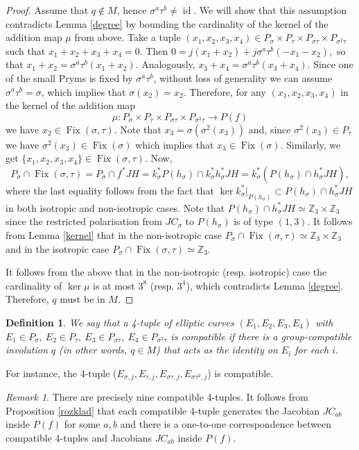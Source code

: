 \documentclass{amsart}
\newtheorem{defn}[thm]{Definition}
\theoremstyle{remark}
\newtheorem{rem}[thm]{Remark}
\numberwithin{equation}{section}
\newcommand{\s}{\sigma}
\DeclareMathOperator{\id}{id}
\DeclareMathOperator{\Fix}{Fix}
\begin{document}
\begin{proof}
      Assume that $q \notin M$, hence $\sigma^a\tau^b \neq \id$. We will show that this assumption contradicts Lemma \ref{degree} by bounding the cardinality of the kernel of the addition map $\mu$ from above. Take a tuple $(x_1, x_2, x_3, x_4) \in P_{\sigma} \times P_{\tau} \times P_{\sigma\tau}\times P_{\sigma^2\tau}$ such that $x_1 + x_2 + x_3 + x_4 = 0$. Then $0 = j(x_1 + x_2) + j\sigma^a\tau^b(-x_1 - x_2),$ so that $x_1 + x_2 = \sigma^a\tau^b(x_1 + x_2)$. Analogously, $x_3 + x_4 = \sigma^a\tau^b(x_3 + x_4)$.
    Since one of the small Pryms is fixed by $\sigma^a\tau^b$, without loss of generality   we can assume $\sigma^a\tau^b = \sigma$, which implies that $\sigma(x_2) = x_2$.
    Therefore, for any $(x_1, x_2, x_3, x_4)$ in the kernel of the addition map $$\mu: P_{\sigma} \times P_{\tau} \times P_{\sigma\tau}\times P_{\sigma^2\tau} \to P(f)$$ we have $x_2 \in \Fix(\sigma, \tau)$.  Note that $x_3 = \sigma(\sigma^2(x_3))$ and, since $\sigma^2(x_3) \in P_{\tau}$ we have $\sigma^2(x_3) \in \Fix(\s)$ which implies that $x_3 \in \Fix(\sigma)$. Similarly, we get $\{x_1, x_2, x_3, x_4\} \in \Fix(\sigma, \tau)$. Now, $$P_{\sigma} \cap \Fix(\sigma, \tau) = P_{\sigma} \cap f^*JH = k_{\sigma}^*P(h_{\sigma}) \cap k_{\s}^*h_{\s}^*JH = k_{\s}^*(P(h_\s) \cap h_{\s}^*JH),$$ where the last equality follows from the fact that $\ker k_{\sigma}^{*}|_{P(h_{\s})} \subset P(h_\s) \cap h_{\s}^*JH$ in both isotropic and non-isotropic cases. Note that $P(h_\s) \cap h_{\s}^*JH \simeq \mathbb{Z}_3 \times \mathbb{Z}_3$ since the restricted polarisation from $JC_{\sigma}$ to $P(h_{\sigma})$ is of type $(1,3)$. It follows from Lemma \ref{kernel} that in the non-isotropic case $P_{\sigma} \cap \Fix(\sigma, \tau) \simeq \mathbb{Z}_3 \times \mathbb{Z}_3$ and in the isotropic case $P_{\sigma} \cap \Fix(\sigma, \tau) \simeq \mathbb{Z}_3$. 
    
    It follows from the above that in the non-isotropic (resp. isotropic) case the cardinality of $\ker \mu$ is at most $3^8$ (resp. $3^4$), which contradicts Lemma \ref{degree}. Therefore, $q$ must be in $M$.
   

   
    
    \end{proof}

    \begin{defn}
        We say that a 4-tuple of elliptic curves $(E_1, E_2, E_3, E_4)$ with $E_1 \in P_{\sigma},\ E_2 \in P_{\tau},\ E_3 \in P_{\sigma\tau},\ E_4 \in P_{\sigma^2\tau}$ is compatible if there is a group-compatible involution $q$ (in other words, $q \in M$) that acts as the identity on $E_i$ for each $i$.
    \end{defn}
    For instance, the 4-tuple ($E_{\sigma, j}, E_{\tau, j}, E_{\sigma\tau, j}, E_{\sigma\tau^2,j}$) is compatible. 
    \begin{rem}
    \label{compatible4}
        There are precisely nine compatible 4-tuples. It follows from Proposition \ref{rozklad} that each compatible 4-tuple generates the Jacobian $JC_{ab}$ inside $P(f)$ for some $a,b$ and there is a one-to-one correspondence between compatible 4-tuples and Jacobians $JC_{ab}$ inside $P(f)$.
    \end{rem}
\end{document}
